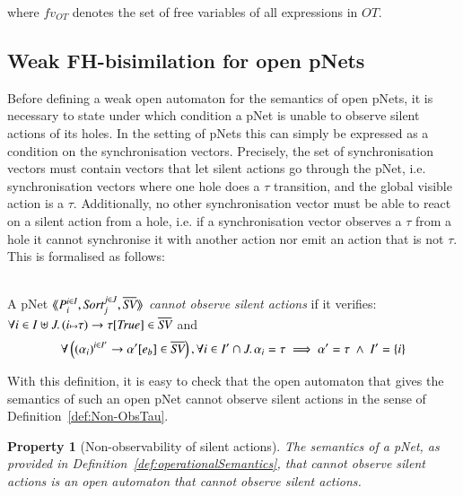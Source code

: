 \documentclass{elsarticle}
\newtheorem{property}{Property}
\begin{document}
where $fv_{OT}$ denotes the set of free variables of all expressions in $OT$.
\subsection{Weak FH-bisimilation for open pNets}

Before defining a weak open automaton for the semantics of open pNets,
it is necessary to state under which condition a pNet is unable to
observe silent actions of its holes. In the setting of pNets this can
simply be expressed as a condition on the synchronisation
vectors. Precisely, the set of synchronisation vectors must contain
vectors that let silent actions go through the pNet,
i.e. synchronisation vectors where one hole does a $\tau$ transition,
and the global visible action is a $\tau$. Additionally, no other
synchronisation vector must be able to react on a silent action from a
hole, i.e. if a synchronisation vector observes a $\tau$ from a hole
it cannot synchronise it with another action nor emit an action that
is not $\tau$. This is formalised as follows:



\begin{definition}\label{def:non-obspNet}~\\
A pNet $\mylangle \pNet_i^{i\in I} , \Sort_j^{j\in J}, \set{\symb{SV}}\myrangle$
 \emph{cannot observe silent actions} if it verifies:\\ $\forall i\in I\uplus J.\, \SV{(i\mapsto \tau)}{\tau}{\True}\in \set{\symb{SV}}$ and 
\begin{equation*}
\forall \left(\SV{{(\alpha_i)}^{i\in I'}} 
{\alpha'} 
{e_b}\in \set{\symb{SV}}\right), %
\forall i\in I'\cap J.\, \alpha_i=\tau \implies %
\alpha'=\tau ~\land~ %
I'=\{i\}
\end{equation*}
\end{definition}




With this definition, it is easy to check that the open automaton that gives the semantics of such an open pNet cannot observe silent actions in the sense of Definition~\ref{def:Non-ObsTau}.

\begin{property}[Non-observability of silent actions]
The  semantics of a pNet, as provided in Definition~\ref{def:operationalSemantics}, that cannot observe silent actions is an open automaton that  cannot observe silent actions.
\end{property}
\end{document}
